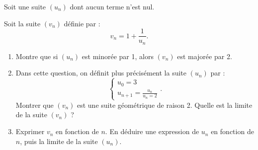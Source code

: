 \begin{question}[topic=suites,class=IG]
  Soit une suite $(u_n)$ dont aucun terme n'est nul.

  Soit la suite $(v_n)$ définie par : \[ v_n = 1 + \frac{1}{u_n} . \]
  \begin{enumerate}
    \item Montre que si $(u_n)$ est minorée par 1, alors $(v_n)$ est majorée
      par 2.
    \item Dans cette question, on définit plus précisément la suite $(u_n)$
      par : \[ \begin{cases} u_0 = 3 \\ u_{n+1} = \frac{u_n}{u_n = 2}
      \end{cases} . \] Montrer que $(v_n)$ est une suite géométrique de
      raison 2. Quelle est la limite de la suite $(v_n)$ ?
    \item Exprimer $v_n$ en fonction de $n$. En déduire une expression de
      $u_n$ en fonction de $n$, puis la limite de la suite $(u_n)$.
  \end{enumerate}
\end{question}
